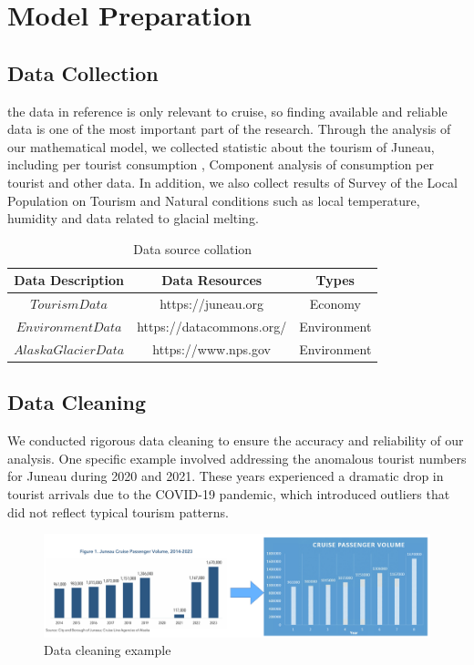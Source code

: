 \documentclass[UTF8]{mcmthesis}
\begin{document}
        \section{Model Preparation}
        \subsection{Data Collection}
        \hspace*{2em}the data in reference is only relevant to cruise, so finding available and reliable data is one of the most important part of the research. Through the analysis of our mathematical model, we collected statistic about the tourism of Juneau, including per tourist consumption , Component analysis of consumption per tourist and other data. In addition, we also collect results of Survey of the Local Population on Tourism and Natural conditions such as local temperature, humidity and data related to glacial melting.
        \begin{table}[htbp]
            \centering
            \caption{Data source collation}
            \vspace{0.5em}
            \begin{tabular}{ccc}
                \toprule                %
                    \textbf{Data Description} & \textbf{Data Resources} & \textbf{Types} \\ 
                \midrule                %
                $Tourism Data$        & https://juneau.org    &  Economy                \\ 
                $Environment Data$        & https://datacommons.org/  & Environment\\ 
                $Alaska Glacier Data$        & https://www.nps.gov   & Environment\\ 
                \bottomrule             %
            \end{tabular}
            \label{tab:notations}
        \end{table}
        \subsection{Data Cleaning}
        \hspace*{2em}We conducted rigorous data cleaning to ensure the accuracy and reliability of our analysis. One specific example involved addressing the anomalous tourist numbers for Juneau during 2020 and 2021. These years experienced a dramatic drop in tourist arrivals due to the COVID-19 pandemic, which introduced outliers that did not reflect typical tourism patterns.
        \begin{figure}[htbp]
            \centering
            \includegraphics[width=16cm]{dataclean.png}
            \caption{Data cleaning example}
        \end{figure}
\end{document}
